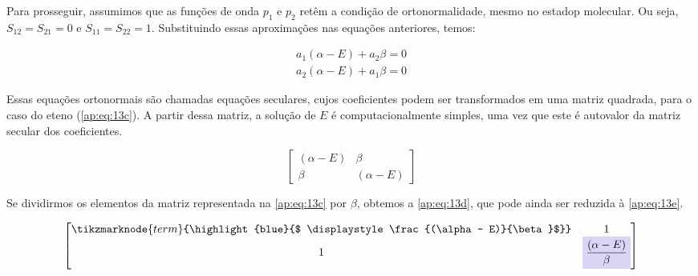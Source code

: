 Para prosseguir, assumimos que as funções de onda $p_1$ e $p_2$ retêm a condição de ortonormalidade, mesmo no estadop molecular. Ou seja, $S_{12} = S_{21} = 0$ e $S_{11} = S_{22} = 1$. Substituindo essas aproximações nas equações anteriores, temos:

\begin{figure}[htb]
    \vspace{2\baselineskip}
\begin{align}
\label{ap:eq:13b}
    a_1 (\alpha - E) + a_2 \beta = 0 \\[0.35cm]
    a_2 (\alpha - E) + a_1 \beta = 0
\end{align}
\end{figure}

Essas equações ortonormais são chamadas equações seculares, cujos coeficientes podem ser transformados em uma matriz quadrada, para o caso do eteno (\autoref{ap:eq:13c}). A partir dessa matriz, a solução de $E$ é computacionalmente simples, uma vez que este é autovalor da matriz secular dos coeficientes.

\begin{equation}
\label{ap:eq:13c}
\begin{bmatrix}
    (\alpha - E) & \beta \\
    \beta  & (\alpha - E)
\end{bmatrix}
\end{equation}

Se dividirmos os elementos da matriz representada na \autoref{ap:eq:13c} por $\beta$, obtemos a \autoref{ap:eq:13d}, que pode ainda ser reduzida à \autoref{ap:eq:13e}.

\begin{figure}[htb]
    \vspace{3 \baselineskip}
\begin{equation}
\label{ap:eq:13d}
\begin{bmatrix}
    \displaystyle \tikzmarknode{term}{\highlight{blue}{$ \displaystyle \frac{(\alpha - E)}{\beta}$}} & 1 \\
    1  & \highlight{blue}{$\displaystyle \frac{(\alpha - E)}{\beta}$}
\end{bmatrix}
\end{equation}
\end{figure}

